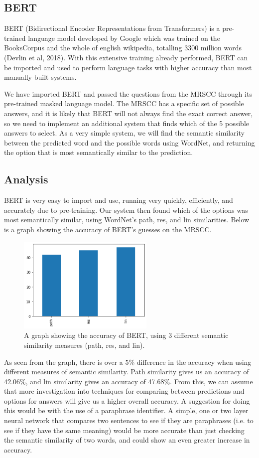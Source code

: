 \documentclass{article}
\begin{document}
\subsection{BERT}
BERT (Bidirectional Encoder Representations from Transformers) is a pre-trained language model developed by Google which was trained on the BooksCorpus and the whole of english wikipedia, totalling 3300 million words (Devlin et al, 2018). With this extensive training already performed, BERT can be imported and used to perform language tasks with higher accuracy than most manually-built systems. 

We have imported BERT and passed the questions from the MRSCC through its pre-trained masked language model. The MRSCC has a specific set of possible answers, and it is likely that BERT will not always find the exact correct answer, so we need to implement an additional system that finds which of the 5 possible answers to select. As a very simple system, we will find the semantic similarity between the predicted word and the possible words using WordNet, and returning the option that is most semantically similar to the prediction.

\subsection{Analysis}
BERT is very easy to import and use, running very quickly, efficiently, and accurately due to pre-training. Our system then found which of the options was most semantically similar, using WordNet's path, res, and lin similarities. Below is a graph showing the accuracy of BERT's guesses on the MRSCC.

\begin{figure}[h]
\includegraphics[width=6.5cm]{graph4.png}
\centering
\caption{A graph showing the accuracy of BERT, using 3 different semantic similarity measures (path, res, and lin).}
\end{figure}

As seen from the graph, there is over a 5\% difference in the accuracy when using different measures of semantic similarity. Path similarity gives us an accuracy of 42.06\%, and lin similarity gives an accuracy of 47.68\%. From this, we can assume that more investigation into techniques for comparing between predictions and options for answers will give us a higher overall accuracy. A suggestion for doing this would be with the use of a paraphrase identifier. A simple, one or two layer neural network that compares two sentences to see if they are paraphrases (i.e. to see if they have the same meaning) would be more accurate than just checking the semantic similarity of two words, and could show an even greater increase in accuracy.
\end{document}
